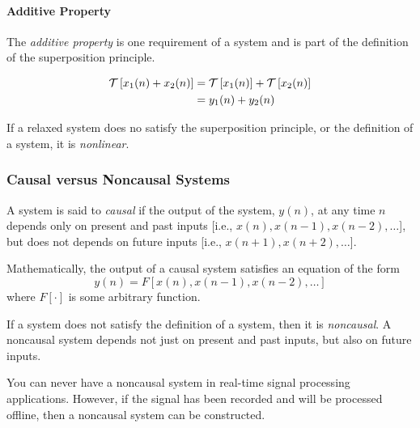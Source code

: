 \paragraph{Additive Property}\label{par:Linear-Additive_Property}
\begin{definition}\label{def:Linear-Additive_Property}
  The \emph{additive property} is one requirement of a  system and is part of the definition of the superposition principle.

  \begin{equation}\label{eq:Linear-Additive_Property}
    \begin{aligned}
      \operatorname{\mathcal{T}} \left[ x_{1}(n) + x_{2}(n) \right] &= \operatorname{\mathcal{T}} \left[ x_{1}(n) \right] + \operatorname{\mathcal{T}} \left[ x_{2}(n) \right] \\
      &= y_{1}(n) + y_{2}(n)
    \end{aligned}
  \end{equation}
\end{definition}

\begin{definition}[Nonlinear]\label{def:Nonlinear}
  If a relaxed system does no satisfy the superposition principle, or the definition of a  system, it is \emph{nonlinear}.
\end{definition}

\subsubsection{Causal versus Noncausal Systems}\label{subsubsec:Causal_vs_Noncausal_Systems}
\begin{definition}[Causal]\label{def:Causal}
  A system is said to \emph{causal} if the output of the system, $y(n)$, at any time $n$ depends only on present and past inputs [i.e., $x(n), x(n-1), x(n-2), \ldots$], but does not depends on future inputs [i.e., $x(n+1), x(n+2), \ldots$].

  Mathematically, the output of a causal system satisfies an equation of the form
  \begin{equation}\label{eq:Causal}
    y(n) = F \left[ x(n), x(n-1), x(n-2), \ldots \right]
  \end{equation}
  where $F\left[ \cdot \right]$ is some arbitrary function.
\end{definition}

\begin{definition}[Noncausal]\label{def:Noncausal}
  If a system does not satisfy the definition of a  system, then it is \emph{noncausal}.
  A noncausal system depends not just on present and past inputs, but also on future inputs.

  \begin{remark}
    You can never have a noncausal system in real-time signal processing applications.
    However, if the signal has been recorded and will be processed offline, then a noncausal system can be constructed.
  \end{remark}
\end{definition}

